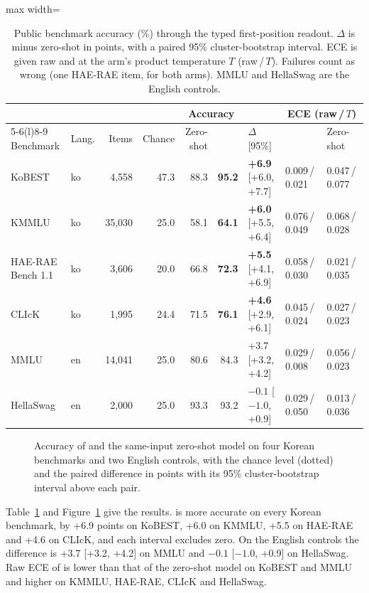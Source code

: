 \begin{table}[t]
\centering
\small
\caption{Public benchmark accuracy (\%) through the typed first-position readout. $\Delta$ is
\expone{} minus zero-shot in points, with a paired 95\% cluster-bootstrap interval. ECE is
given raw and at the arm's product temperature $T$ (raw\,/\,$T$). Failures count as wrong
(one HAE-RAE item, for both arms). MMLU and HellaSwag are the English controls.}
\label{tab:kbench}
\setlength{\tabcolsep}{4pt}
\begin{adjustbox}{max width=\linewidth}
\begin{tabular}{@{}llrrrrlll@{}}
\toprule
 & & & & \multicolumn{2}{c}{Accuracy} & & \multicolumn{2}{c}{ECE (raw\,/\,$T$)} \\
\cmidrule(lr){5-6}\cmidrule(l){8-9}
Benchmark & Lang. & Items & Chance & Zero-shot & \expone{} & $\Delta$ [95\%] & \expone{} & Zero-shot \\
\midrule
KoBEST & ko & 4,558 & 47.3 & 88.3 & \textbf{95.2} & \textbf{+6.9} [+6.0, +7.7] & 0.009\,/\,0.021 & 0.047\,/\,0.077 \\
KMMLU & ko & 35,030 & 25.0 & 58.1 & \textbf{64.1} & \textbf{+6.0} [+5.5, +6.4] & 0.076\,/\,0.049 & 0.068\,/\,0.028 \\
HAE-RAE Bench 1.1 & ko & 3,606 & 20.0 & 66.8 & \textbf{72.3} & \textbf{+5.5} [+4.1, +6.9] & 0.058\,/\,0.030 & 0.021\,/\,0.035 \\
CLIcK & ko & 1,995 & 24.4 & 71.5 & \textbf{76.1} & \textbf{+4.6} [+2.9, +6.1] & 0.045\,/\,0.024 & 0.027\,/\,0.023 \\
\midrule
MMLU & en & 14,041 & 25.0 & 80.6 & 84.3 & +3.7 [+3.2, +4.2] & 0.029\,/\,0.008 & 0.056\,/\,0.023 \\
HellaSwag & en & 2,000 & 25.0 & 93.3 & 93.2 & $-0.1$ [$-1.0$, +0.9] & 0.029\,/\,0.050 & 0.013\,/\,0.036 \\
\bottomrule
\end{tabular}
\end{adjustbox}
\end{table}

\begin{figure}[t]
\centering
{}
\caption{Accuracy of \expone{} and the same-input zero-shot model on four Korean benchmarks
and two English controls, with the chance level (dotted) and the paired difference in points
with its 95\% cluster-bootstrap interval above each pair.}
\label{fig:korean}
\end{figure}

Table~\ref{tab:kbench} and Figure~\ref{fig:korean} give the results. \expone{} is more
accurate on every Korean benchmark, by +6.9 points on KoBEST, +6.0 on KMMLU, +5.5 on HAE-RAE
and +4.6 on CLIcK, and each interval excludes zero. On the English controls the difference
is +3.7 [+3.2, +4.2] on MMLU and $-0.1$ [$-1.0$, +0.9] on HellaSwag. Raw ECE of \expone{} is
lower than that of the zero-shot model on KoBEST and MMLU and higher on KMMLU, HAE-RAE, CLIcK
and HellaSwag.

